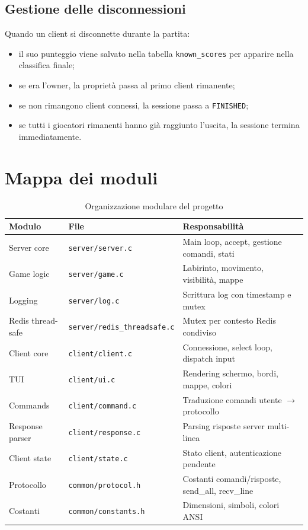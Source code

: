 \documentclass[a4paper,11pt]{article}
\begin{document}
\subsection{Gestione delle disconnessioni}

Quando un client si disconnette durante la partita:
\begin{itemize}[topsep=0.3em]
    \item il suo punteggio viene salvato nella tabella \texttt{known\_scores}
          per apparire nella classifica finale;
    \item se era l'owner, la proprietà passa al primo client rimanente;
    \item se non rimangono client connessi, la sessione passa a
          \texttt{FINISHED};
    \item se tutti i giocatori rimanenti hanno già raggiunto l'uscita,
          la sessione termina immediatamente.
\end{itemize}

\section{Mappa dei moduli}

\begin{table}[h]
\centering
\begin{tabular}{l|l|p{6cm}}
\textbf{Modulo} & \textbf{File} & \textbf{Responsabilità} \\
\hline
Server core     & \texttt{server/server.c}   & Main loop, accept, gestione comandi, stati \\
Game logic      & \texttt{server/game.c}     & Labirinto, movimento, visibilità, mappe \\
Logging         & \texttt{server/log.c}      & Scrittura log con timestamp e mutex \\
Redis thread-safe & \texttt{server/redis\_threadsafe.c} & Mutex per contesto Redis condiviso \\
\hline
Client core     & \texttt{client/client.c}   & Connessione, select loop, dispatch input \\
TUI             & \texttt{client/ui.c}       & Rendering schermo, bordi, mappe, colori \\
Commands        & \texttt{client/command.c}  & Traduzione comandi utente $\to$ protocollo \\
Response parser & \texttt{client/response.c} & Parsing risposte server multi-linea \\
Client state    & \texttt{client/state.c}    & Stato client, autenticazione pendente \\
\hline
Protocollo      & \texttt{common/protocol.h} & Costanti comandi/risposte, send\_all, recv\_line \\
Costanti        & \texttt{common/constants.h}& Dimensioni, simboli, colori ANSI \\
\end{tabular}
\caption{Organizzazione modulare del progetto}
\end{table}
\end{document}
